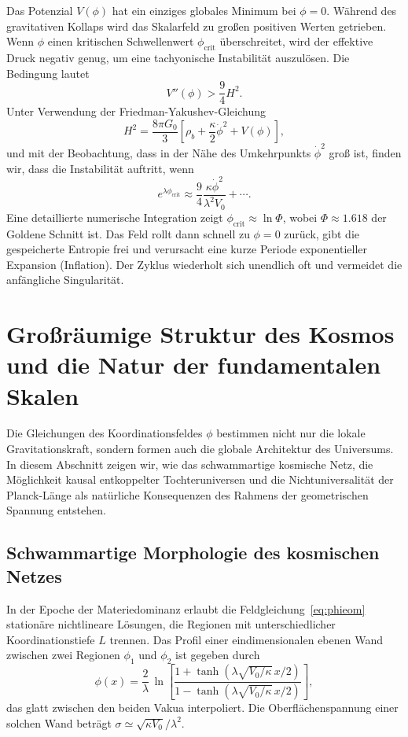 \documentclass[12pt,a4paper]{article}
\begin{document}
	Das Potenzial \(V(\phi)\) hat ein einziges globales Minimum bei \(\phi=0\). Während des gravitativen Kollaps wird das Skalarfeld zu großen positiven Werten getrieben. Wenn \(\phi\) einen kritischen Schwellenwert \(\phi_{\mathrm{crit}}\) überschreitet, wird der effektive Druck negativ genug, um eine tachyonische Instabilität auszulösen. Die Bedingung lautet
	\[
	V''(\phi) > \frac{9}{4} H^2.
	\]
	Unter Verwendung der Friedman-Yakushev-Gleichung
	\[
	H^2 = \frac{8\pi G_0}{3} \left[ \rho_b + \frac{\kappa}{2}\dot\phi^2 + V(\phi) \right],
	\]
	und mit der Beobachtung, dass in der Nähe des Umkehrpunkts \(\dot\phi^2\) groß ist, finden wir, dass die Instabilität auftritt, wenn
	\[
	e^{\lambda\phi_{\mathrm{crit}}} \approx \frac{9}{4} \frac{\kappa\dot\phi^2}{\lambda^2 V_0} + \cdots .
	\]
	Eine detaillierte numerische Integration zeigt \(\phi_{\mathrm{crit}} \approx \ln\Phi\), wobei \(\Phi \approx 1.618\) der Goldene Schnitt ist. Das Feld rollt dann schnell zu \(\phi=0\) zurück, gibt die gespeicherte Entropie frei und verursacht eine kurze Periode exponentieller Expansion (Inflation). Der Zyklus wiederholt sich unendlich oft und vermeidet die anfängliche Singularität.
	
	\section{Großräumige Struktur des Kosmos und die Natur der fundamentalen Skalen}
	\label{sec:sponge}
	
	Die Gleichungen des Koordinationsfeldes \(\phi\) bestimmen nicht nur die lokale Gravitationskraft, sondern formen auch die globale Architektur des Universums. In diesem Abschnitt zeigen wir, wie das schwammartige kosmische Netz, die Möglichkeit kausal entkoppelter Tochteruniversen und die Nichtuniversalität der Planck-Länge als natürliche Konsequenzen des Rahmens der geometrischen Spannung entstehen.
	
	\subsection{Schwammartige Morphologie des kosmischen Netzes}
	In der Epoche der Materiedominanz erlaubt die Feldgleichung~\eqref{eq:phieom} stationäre nichtlineare Lösungen, die Regionen mit unterschiedlicher Koordinationstiefe \(L\) trennen. Das Profil einer eindimensionalen ebenen Wand zwischen zwei Regionen \(\phi_1\) und \(\phi_2\) ist gegeben durch
	\begin{equation}
		\phi(x) = \frac{2}{\lambda}\,\ln\!\left[
		\frac{1 + \tanh(\lambda\sqrt{V_0/\kappa}\, x/2)}
		{1 - \tanh(\lambda\sqrt{V_0/\kappa}\, x/2)}
		\right],
		\label{eq:domain-wall}
	\end{equation}
	das glatt zwischen den beiden Vakua interpoliert. Die Oberflächenspannung einer solchen Wand beträgt \(\sigma \simeq \sqrt{\kappa V_0}/\lambda^2\).
	
\end{document}
